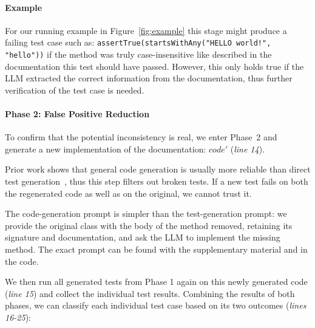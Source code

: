 \documentclass[acmsmall, screen]{acmart}
\begin{document}
\paragraph*{Example} 
For our running example in Figure~\ref{fig:example} this stage might produce a failing test case such as: \texttt{assertTrue(startsWithAny("HELLO world!", {"hello"}))} if the method was truly case-insensitive like described in the documentation this test should have passed. 
However, this only holds true if the LLM extracted the correct information from the documentation, thus further verification of the test case is needed. 

\paragraph{\textbf{Phase 2: False Positive Reduction}}
To confirm that the potential inconsistency is real, we enter Phase~2 and generate a new implementation of the documentation: $code'$ (\textit{line 14}). 

Prior work shows that general code generation is usually more reliable than direct test generation~\cite{ni2023lever, chen2022codet}, thus this step filters out broken tests.
If a new test fails on both the regenerated code as well as on the original, we cannot trust it.

The code-generation prompt is simpler than the test-generation prompt: we provide the original class with the body of the method removed, retaining its signature and documentation, and ask the LLM to implement the missing method. 
The exact prompt can be found with the supplementary material and in the code.

We then run all generated tests from Phase 1 again on this newly generated code (\textit{line 15}) and collect the individual test results. 
Combining the results of both phases, we can classify each individual test case based on its two outcomes (\textit{lines 16-25}):
\end{document}
